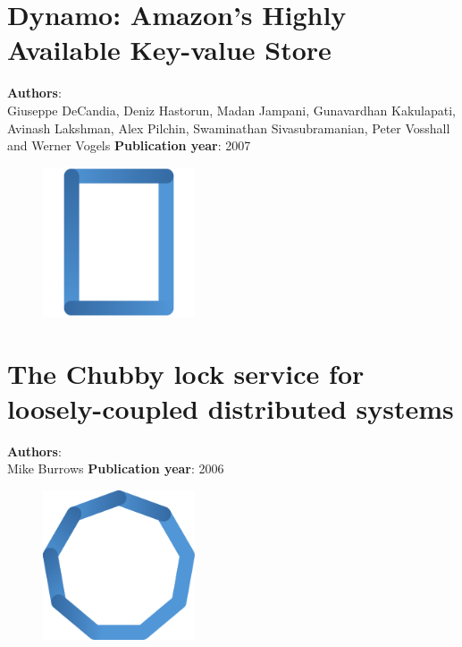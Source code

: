 \documentclass[11pt,fleqn]{book} %
\begin{document}
\chapter{Dynamo: Amazon’s Highly Available Key-value Store}
\vspace*{-7mm}
\Large \textbf{Authors}: \\
Giuseppe DeCandia, Deniz Hastorun, Madan Jampani, Gunavardhan Kakulapati, Avinash Lakshman, Alex Pilchin, Swaminathan Sivasubramanian, Peter Vosshall and Werner Vogels
\newline\newline
\textbf{Publication year}: 2007
\begin{figure}[b]
    \centering
    \includegraphics[width=0.4\textwidth]{distributed-systems-rectangle-blue.pdf}
\end{figure}


\chapter{The Chubby lock service for loosely-coupled distributed systems}
\vspace*{-7mm}
\Large \textbf{Authors}: \\
Mike Burrows
\newline\newline
\textbf{Publication year}: 2006
\begin{figure}[b]
    \centering
    \includegraphics[width=0.4\textwidth]{distributed-systems-blue.pdf}
\end{figure}

\end{document}
